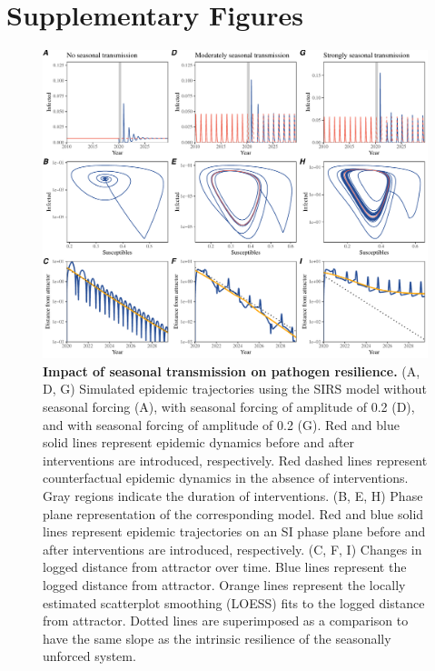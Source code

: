 \documentclass[12pt]{article}
\begin{document}
\pagebreak

\section*{Supplementary Figures}

\begin{figure}[!th]
\includegraphics[width=\textwidth]{../figure2/figure2_simple_seas.pdf}
\caption{
\textbf{Impact of seasonal transmission on pathogen resilience.}
(A, D, G) Simulated epidemic trajectories using the SIRS model without seasonal forcing (A), with seasonal forcing of amplitude of 0.2 (D), and with seasonal forcing of amplitude of 0.2 (G).
Red and blue solid lines represent epidemic dynamics before and after interventions are introduced, respectively.
Red dashed lines represent counterfactual epidemic dynamics in the absence of interventions.
Gray regions indicate the duration of interventions.
(B, E, H) Phase plane representation of the corresponding model.
Red and blue solid lines represent epidemic trajectories on an SI phase plane before and after interventions are introduced, respectively.
(C, F, I) Changes in logged distance from attractor over time.
Blue lines represent the logged distance from attractor.
Orange lines represent the locally estimated scatterplot smoothing (LOESS) fits to the logged distance from attractor.
Dotted lines are superimposed as a comparison to have the same slope as the intrinsic resilience of the seasonally unforced system.
}
\end{figure}
\end{document}

